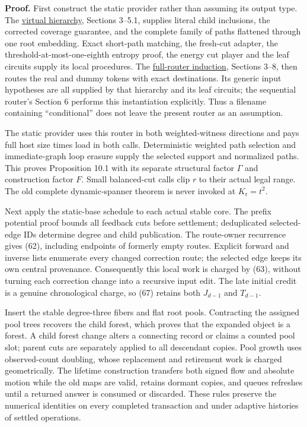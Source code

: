 \textbf{Proof.} First construct the static provider rather than assuming its output type. The \href{https://github.com/icekylinx/algorithm-frontier/blob/main/manuscripts/graph-backends/virtual-expander-hierarchy-reconstruction.md}{virtual hierarchy}, Sections 3--5.1, supplies literal child inclusions, the corrected coverage guarantee, and the complete family of paths flattened through one root embedding. Exact short-path matching, the fresh-cut adapter, the threshold-at-most-one-eighth entropy proof, the energy cut player and the leaf circuits supply its local procedures. The \href{https://github.com/icekylinx/algorithm-frontier/blob/main/manuscripts/graph-backends/conditional-full-router-from-shufflers.md}{full-router induction}, Sections 3--8, then routes the real and dummy tokens with exact destinations. Its generic input hypotheses are all supplied by that hierarchy and its leaf circuits; the sequential router's Section 6 performs this instantiation explicitly. Thus a filename containing ``conditional'' does not leave the present router as an assumption.

The static provider uses this router in both weighted-witness directions and pays full host size times load in both calls. Deterministic weighted path selection and immediate-graph loop erasure supply the selected support and normalized paths. This proves Proposition 10.1 with its separate structural factor \(\Gamma\) and construction factor \(F\). Small balanced-cut calls clip \(r\) to their actual legal range. The old complete dynamic-spanner theorem is never invoked at \(K_{\mathrm r}=t^2\).

Next apply the static-base schedule to each actual stable core. The prefix potential proof bounds all feedback cuts before settlement; deduplicated selected-edge IDs determine degree and child publication. The route-owner recurrence gives (62), including endpoints of formerly empty routes. Explicit forward and inverse lists enumerate every changed correction route; the selected edge keeps its own central provenance. Consequently this local work is charged by (63), without turning each correction change into a recursive input edit. The late initial credit is a genuine chronological charge, so (67) retains both \(J_{d-1}\) and \(T_{d-1}\).

Insert the stable degree-three fibers and flat root pools. Contracting the assigned pool trees recovers the child forest, which proves that the expanded object is a forest. A child forest change alters a connecting record or claims a counted pool slot; parent cuts are separately applied to all descendant copies. Pool growth uses observed-count doubling, whose replacement and retirement work is charged geometrically. The lifetime construction transfers both signed flow and absolute motion while the old maps are valid, retains dormant copies, and queues refreshes until a returned answer is consumed or discarded. These rules preserve the numerical identities on every completed transaction and under adaptive histories of settled operations.

